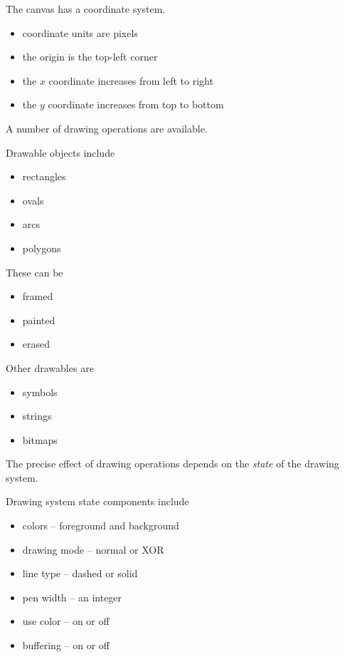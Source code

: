 \begin{slide}{}
\begin{center}
\mbox{}
\end{center}

The canvas has a coordinate system.
\begin{itemize}
\item coordinate units are pixels
\item the origin is the top-left corner
\item the $x$ coordinate increases from left to right
\item the $y$ coordinate increases from top to bottom
\end{itemize}
\end{slide}

\begin{slide}{}
A number of drawing operations are available.

Drawable objects include
\begin{itemize}
\item rectangles
\item ovals
\item arcs
\item polygons
\end{itemize}
These can be
\begin{itemize}
\item framed
\item painted
\item erased
\end{itemize}
Other drawables are
\begin{itemize}
\item symbols
\item strings
\item bitmaps
\end{itemize}
\end{slide}

\begin{slide}{}
The precise effect of drawing operations depends on the {\em state} of the
drawing system.

Drawing system state components include
\begin{itemize}
\item colors -- foreground and background
\item drawing mode -- normal or XOR
\item line type -- dashed or solid
\item pen width -- an integer
\item use color -- on or off
\item buffering -- on or off
\end{itemize}
\end{slide}

